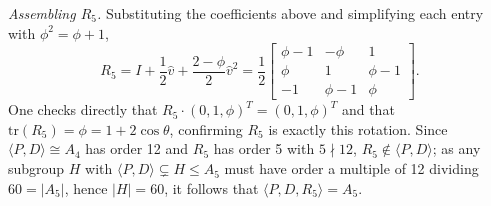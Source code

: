 \documentclass{amsart}
\theoremstyle{plain}
\theoremstyle{definition}
\begin{document}
\emph{Assembling $R_5$.} Substituting the coefficients above and simplifying each entry with $\phi^2=\phi+1$,
\begin{equation*}
    R_5 = I + \frac12\hat v + \frac{2-\phi}{2}\hat v^2 = \frac12\begin{bmatrix}\phi-1 & -\phi & 1\\ \phi & 1 & \phi-1\\ -1 & \phi-1 & \phi\end{bmatrix}.
\end{equation*}
One checks directly that $R_5\cdot(0,1,\phi)^T=(0,1,\phi)^T$ and that $\mathrm{tr}(R_5)=\phi=1+2\cos\theta$, confirming $R_5$ is exactly this rotation. Since $\langle P,D\rangle\cong A_4$ has order 12 and $R_5$ has order 5 with $5\nmid 12$, $R_5\notin\langle P,D\rangle$; as any subgroup $H$ with $\langle P,D\rangle\subsetneq H\leq A_5$ must have order a multiple of 12 dividing $60=|A_5|$, hence $|H|=60$, it follows that $\langle P,D,R_5\rangle=A_5$.
\end{document}
